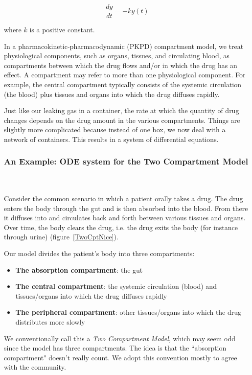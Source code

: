 \documentclass[11pt]{amsart}
\begin{document}
$$ \frac{dy}{dt} = -ky(t) $$

where $k$ is a positive constant.

In a pharmacokinetic-pharmacodynamic (PKPD) compartment model, we treat physiological components, such as organs, tissues, and circulating blood, as compartments between which the drug flows and/or in which the drug has an effect. A compartment may refer to more than one physiological component. For example, the central compartment typically consists of the systemic circulation (the blood) plus tissues and organs into which the drug diffuses rapidly.

Just like our leaking gas in a container, the rate at which the quantity of drug changes depends on the drug amount in the various compartments. Things are slightly more complicated because instead of one box, we now deal with a network of containers. This results in a system of differential equations.

\subsubsection{An Example: ODE system for the Two Compartment Model} \ \\ \ \\
Consider the common scenario in which a patient orally takes a drug. The drug enters the body through the gut and is then absorbed into the blood. From there it diffuses into and circulates back and forth between various tissues and organs. Over time, the body clears the drug, i.e. the drug exits the body (for instance through urine)  (figure~\ref{TwoCptNice}).

Our model divides the patient's body into three compartments:
\begin{itemize}
  \item \textbf{The absorption compartment}: the gut
  \item \textbf{The central compartment}: the systemic circulation (blood) and tissues/organs into which the drug diffuses rapidly
  \item \textbf{The peripheral compartment}: other tissues/organs into which the drug distributes more slowly
\end{itemize}

We conventionally call this a \textit{Two Compartment Model}, which may seem odd since the model has three compartments. The idea is that the ``absorption compartment" doesn't really count. We adopt this convention mostly to agree with the community.
\end{document}
